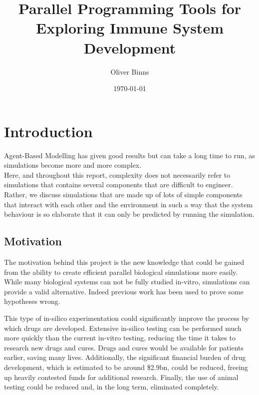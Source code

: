 \documentclass{UoYCSproject}
\title{Parallel Programming Tools for Exploring Immune System Development}
\author{Oliver Binns}
\date{\today}
\begin{document}
\maketitle
\listoffigures
\listoftables
\printglossary[type=\acronymtype]
\printglossary


\chapter{Introduction}

Agent-Based Modelling has given good results
but can take a long time to run, as simulations become more and more complex.
\\

Here, and throughout this report, complexity does not necessarily refer to simulations that contains several components that are difficult to engineer.
Rather, we discuss simulations that are made up of lots of simple components that interact with each other and the environment in such a way that the system behaviour is so elaborate that it can only be predicted by running the simulation.
\\

\section{Motivation}
The motivation behind this project is the new knowledge that could be gained from the ability to create efficient parallel biological simulations more easily.
While many biological systems can not be fully studied \gls{in-vitro}, simulations can provide a valid alternative.
Indeed previous work has been used to prove some hypotheses wrong.

This type of \gls{in-silico} experimentation could significantly improve the process by which drugs are developed.
Extensive \gls{in-silico} testing can be performed much more quickly than the current \gls{in-vitro} testing, reducing the time it takes to research new drugs and cures.
Drugs and cures would be available for patients earlier, saving many lives.
Additionally, the significant financial burden of drug development, which is estimated to be around \$2.9bn\cite{drug_cost}, could be reduced, freeing up heavily contested funds for additional research.
Finally, the use of animal testing could be reduced and, in the long term, eliminated completely.
\end{document}
